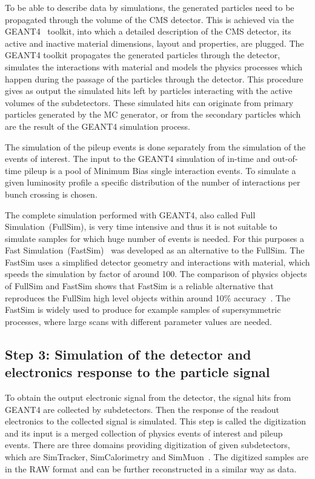 To be able to describe data by simulations, the generated particles need to be propagated through the volume of the CMS detector. This is achieved via the GEANT4~\cite{Agostinelli:2002hh, Lefebure:1999wja} toolkit, into which a detailed description of the CMS detector, its active and inactive material dimensions, layout and properties, are plugged. The GEANT4 toolkit propagates the generated particles through the detector, simulates the interactions with material and models the physics processes which happen during the passage of the particles through the detector. This procedure gives as output the simulated hits left by particles interacting with the active volumes of the subdetectors. These simulated hits can originate from primary particles generated by the MC generator, or from the secondary particles which are the result of the GEANT4 simulation process.

The simulation of the pileup events is done separately from the simulation of the events of interest. The input to the GEANT4 simulation of in-time and out-of-time pileup is a pool of Minimum Bias single interaction events. To simulate a given luminosity profile a specific distribution of the number of interactions per bunch crossing is chosen. 


The complete simulation performed with GEANT4, also called Full Simulation~(FullSim), is very time intensive and thus it is not suitable to simulate samples for which huge number of events is needed. For this purposes a Fast Simulation~(FastSim)~\cite{Sekmen:2017hzs, CMS:2010spa, Giammanco:2014bza} was developed as an alternative to the FullSim. The FastSim uses a simplified detector geometry and interactions with material, which speeds the simulation by factor of around 100. The comparison of physics objects of FullSim and FastSim shows that FastSim is a reliable alternative that reproduces the FullSim high level objects within around 10\% accuracy~\cite{Sekmen:2017hzs, Abdullin:2011zz}. The FastSim is widely used to produce for example samples of supersymmetric processes, where large scans with different parameter values are needed.

\subsection{Step 3: Simulation of the detector and electronics response to the particle signal}

To obtain the output electronic signal from the detector, the signal hits from GEANT4 are collected by subdetectors. Then the response of the readout electronics to the collected signal is simulated. This step is called the digitization and its input is a merged collection of physics events of interest and pileup events. There are three domains providing digitization of given subdetectors, which are SimTracker, SimCalorimetry and SimMuon~\cite{website:simdigi}. The digitized samples are in the RAW format and can be further reconstructed in a similar way as data.

